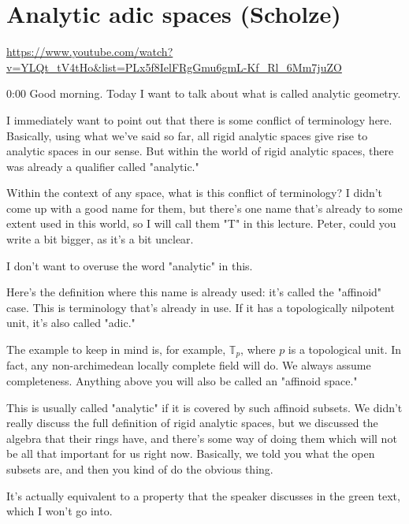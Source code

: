 
\section{\ufs Analytic adic spaces (Scholze)}

\url{https://www.youtube.com/watch?v=YLQt_tV4tHo&list=PLx5f8IelFRgGmu6gmL-Kf_Rl_6Mm7juZO}
\renewcommand{\yt}[2]{\href{https://www.youtube.com/watch?v=YLQt_tV4tHo&list=PLx5f8IelFRgGmu6gmL-Kf_Rl_6Mm7juZO&t=#1}{#2}}
\vspace{1em}

\begin{unfinished}{0:00}
Good morning. Today I want to talk about what is called analytic geometry.

I immediately want to point out that there is some conflict of terminology here. Basically, using what we've said so far, all rigid analytic spaces give rise to analytic spaces in our sense. But within the world of rigid analytic spaces, there was already a qualifier called "analytic." 

Within the context of any space, what is this conflict of terminology?  I didn't come up with a good name for them, but there's one name that's already to some extent used in this world, so I will call them "T" in this lecture. Peter, could you write a bit bigger, as it's a bit unclear. 

I don't want to overuse the word "analytic" in this.

Here's the definition where this name is already used: it's called the "affinoid" case. This is terminology that's already in use. If it has a topologically nilpotent unit, it's also called "adic."

The example to keep in mind is, for example, $\mathbb{T}_p$, where $p$ is a topological unit. In fact, any non-archimedean locally complete field will do. We always assume completeness. Anything above you will also be called an "affinoid space."

This is usually called "analytic" if it is covered by such affinoid subsets. We didn't really discuss the full definition of rigid analytic spaces, but we discussed the algebra that their rings have, and there's some way of doing them which will not be all that important for us right now. Basically, we told you what the open subsets are, and then you kind of do the obvious thing.

It's actually equivalent to a property that the speaker discusses in the green text, which I won't go into.


\end{unfinished}
